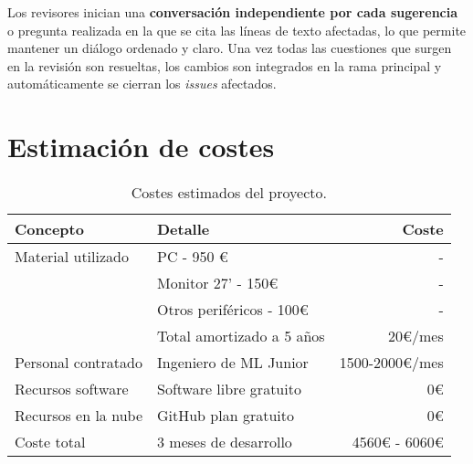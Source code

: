 Los revisores inician una \textbf{conversación independiente por cada sugerencia} o pregunta realizada en la que se cita las líneas de texto afectadas, lo que permite mantener un diálogo ordenado y claro. Una vez todas las cuestiones que surgen en la revisión son resueltas, los cambios son integrados en la rama principal y automáticamente se cierran los \textit{issues} afectados.

\section{Estimación de costes}


\begin{table}[H]
	\centering
	\begin{tabular}{| l | l | r |}
    		\hline
        \textbf{Concepto} & \textbf{Detalle} & \textbf{Coste} \\
        \hline
        Material utilizado 	& PC - 950 € & - \\
        						& Monitor 27' - 150€ & - \\
        						& Otros periféricos - 100€ & - \\
        						& Total amortizado a 5 años & 20€/mes \\
        Personal contratado 	& Ingeniero de ML Junior	& 1500-2000€/mes \\
        Recursos software 	& Software libre gratuito & 0€ \\
        Recursos en la nube 	& GitHub plan gratuito & 0€ \\
        \hline
        Coste total 			& 3 meses de desarrollo & 4560€ - 6060€ \\
        \hline
	\end{tabular}
	\caption{Costes estimados del proyecto.}
\end{table}